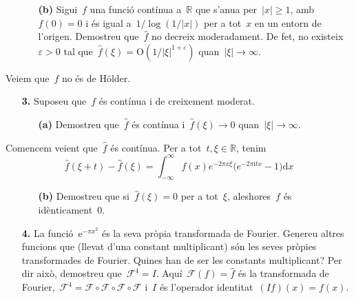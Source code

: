 \documentclass[a4paper]{article}
\theoremstyle{definition}
\newcommand{\iu}{\mathrm{i}}
\newcommand{\e}{\mathrm{e}}
\newcommand{\uppi}{\pi}
\newcommand{\diff}{\mathrm{d}}
\newcommand{\abs}[1]{\lvert{#1}\rvert}
\newcommand{\F}{\mathcal{F}}
\begin{document}
\begin{enumerate}
    \item[]\begin{enumerate}
        \item[\textbf{(b)}] Sigui~\(f\) una funció contínua a~\(\mathbb{R}\) que
            s'anu{\lgem}a per~\(\abs{x}\geq1\), amb~\(f(0)=0\) i és igual
            a~\(1/\log(1/\abs{x})\) per a tot~\(x\) en un entorn de l'origen.
            Demostreu que~\(\widehat{f}\) no decreix moderadament.
            De fet, no existeix~\(\varepsilon>0\) tal que~\(\widehat{f}(\xi) =
            \textrm{O}(1/\abs{\xi}^{1+\varepsilon})\)
            quan~\(\abs{\xi}\to\infty\).
    \end{enumerate}
\end{enumerate}

Veiem que~\(f\) no és de H\"older.

\begin{enumerate}
    \item[\textbf{3.}] Suposeu que~\(f\) és contínua i de creixement moderat.
        \begin{enumerate}
            \item[\textbf{(a)}] Demostreu que~\(\widehat{f}\) és contínua
                i~\(\widehat{f}(\xi)\to0\) quan~\(\abs{\xi}\to\infty\).
        \end{enumerate}
\end{enumerate}

Comencem veient que~\(\widehat{f}\) és contínua.
Per a tot~\(t,\xi\in\mathbb{R}\), tenim
\[
    \widehat{f}(\xi + t)-\widehat{f}(\xi)
    =
    \int_{-\infty}^{\infty}
    f(x)
    e^{-2\uppi x\xi}
    \bigl(
        e^{-2\uppi\iu tx} - 1
    \bigr)
    \diff x
\]

\begin{enumerate}
    \item[]\begin{enumerate}
        \item[\textbf{(b)}] Demostreu que si~\(\widehat{f}(\xi) = 0\) per a
            tot~\(\xi\), aleshores~\(f\) és idènticament~\(0\).
    \end{enumerate}
\end{enumerate}

\begin{enumerate}
    \item[\textbf{4.}] La funció~\(\e^{-\uppi x^{2}}\) és la seva pròpia
        transformada de Fourier.
        Genereu altres funcions que (llevat d'una constant multiplicant) són les
        seves pròpies transformades de Fourier.
        Quines han de ser les constants multiplicant?
        Per dir això, demostreu que~\(\F^{4} = I\).
        Aquí~\(\F(f) = \widehat{f}\) és la transformada de Fourier,~\(\F^{4} =
        \F\circ\F\circ\F\circ\F\) i~\(I\) és l'operador identitat~\((If)(x) =
        f(x)\).
\end{enumerate}
\end{document}

